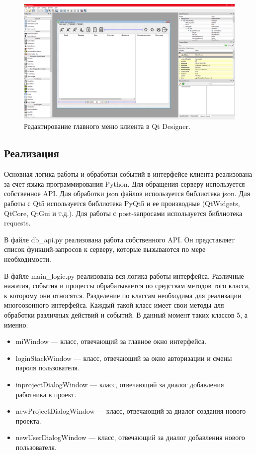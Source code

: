 \begin{figure}[h]
    \centering
    \includegraphics[width=1\linewidth]{img/qtdesigner.png}
    \caption{Редактирование главного меню клиента в Qt Designer.}
    \label{fig:qtdesigner}
\end{figure}


\clearpage
\subsection{Реализация}
Основная логика работы и обработки событий в интерфейсе клиента реализована за счет языка программирования Python. Для обращения серверу используется собственное API. Для обработки json файлов используется библиотека json. Для работы с Qt5 используется библиотека PyQt5 и ее производные (QtWidgets, QtCore, QtGui и т.д.). Для работы с post-запросами используется библиотека requests.

В файле db\_api.py реализована работа собственного API. Он представляет список функций-запросов к серверу, которые вызываются по мере необходимости.





В файле main\_logic.py реализована вся логика работы интерфейса. Различные нажатия, события и процессы обрабатывается по средствам методов того класса, к которому они относятся. Разделение по классам необходима для реализации многооконного интерфейса. Каждый такой класс имеет свои методы для обработки различных действий и событий. В данный момент таких классов 5, а именно:
\begin{itemize}
    \item miWindow --- класс, отвечающий за главное окно интерфейса.
    \item loginStackWindow --- класс, отвечающий за окно авторизации и смены пароля пользователя.
    \item inprojectDialogWindow --- класс, отвечающий за диалог добавления работника в проект.
    \item newProjectDialogWindow --- класс, отвечающий за диалог создания нового проекта.
    \item newUserDialogWindow --- класс, отвечающий за диалог добавления нового пользователя.
\end{itemize}

